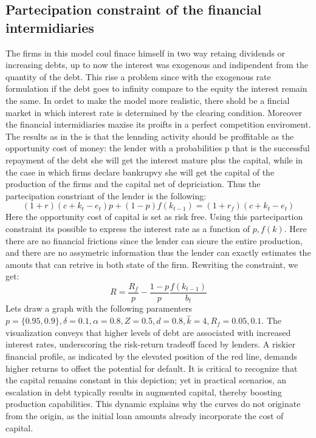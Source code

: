 \documentclass[12pt]{article}
\begin{document}
\subsection{Partecipation constraint of the financial intermidiaries }
The firms in this model coul finace himself in two way retaing dividends or increasing debts, up to now the interest was
exogenous and indipendent from the quantity of the debt. This rise a problem since with the exogenous rate formulation
if the debt goes to infinity compare to the equity the interest remain the same. In ordet to make the model more
realistic, there shold be a fincial market in which interest rate is determined by the clearing condition. Moreover the
financial intermidiaries maxise its proifts in a perfect competition enviroment. The results as in the \cite{BerGer86}
is that the lennding activity should be proffitable as the opportunity cost of money: the lender with a probabilities p
that is the successful repayment of the debt she will get the interest mature plus the capital, while in the case in
which firms declare bankrupvy she will get the capital of the production of the firms and the capital net of
depriciation. 
Thus the partecipation constriant of the lender is the following:
\[(1+r)(c+k_t -e_t)p + (1-p)f(k_{t-1}) = (1+r_f)(c+k_t -e_t) \]
Here the opportunity cost of capital is set as risk free. Using this partecipartion constraint its possible to express
the interest rate as a function of \(p,f(k)\). Here there are no financial frictions since the lender can sicure the
entire production, and there are no assymetric information thus the lender can exactly estimates the amouts that can
retrive in both state of the firm.
Rewriting the constraint, we get:
\[R=\frac{R_f}{p}  -\frac{ 1-p }{ p }\frac{f(k_{t-1})}{b_t}\]
Lets draw a graph with the following paramenters \(p = \{0.95,0.9\}, \delta = 0.1, \alpha = 0.8, Z = 0.5, d = 0.8,\widehat{k} =
4, R_f={0.05,0.1} \).
The visualization conveys that higher levels of debt are associated with increased interest rates, underscoring the
risk-return tradeoff faced by lenders. A riskier financial profile, as indicated by the elevated position of the red
line, demands higher returns to offset the potential for default. It is critical to recognize that the capital remains
constant in this depiction; yet in practical scenarios, an escalation in debt typically results in augmented capital,
thereby boosting production capabilities. This dynamic explains why the curves do not originate from the origin, as the
initial loan amounts already incorporate the cost of capital. 
\end{document}
